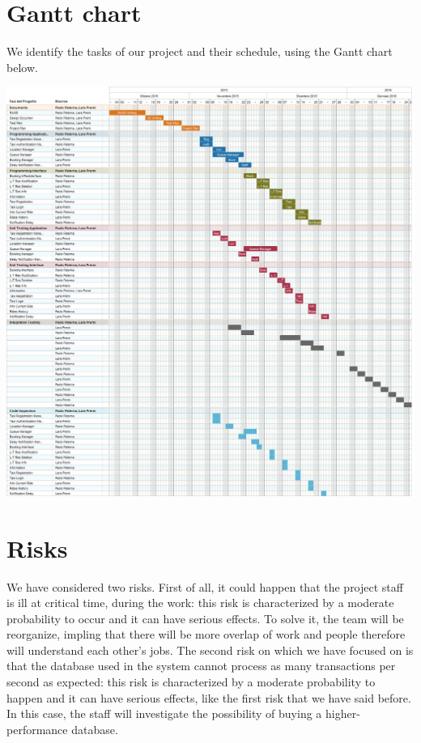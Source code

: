 \section{Gantt chart}
We identify the tasks of our project and their schedule, using the Gantt chart below.
		\begin{center}
			\includegraphics[width=1\textwidth]{./images/myTaxiService.png}
		\end{center}
\section{Risks}
We have considered two risks. First of all, it could happen that the project staff is ill at critical time, during the work: this risk is characterized by a moderate probability to occur and it can have serious effects. To solve it, the team will be reorganize, impling that there will be more overlap of work and people therefore will understand each other's jobs.
The second risk on which we have focused on is that the database used in the system cannot process as many transactions per second as expected: this risk is characterized by a moderate probability to happen and it can have serious effects, like the first risk that we have said before. In this case, the staff will investigate the possibility of buying a higher-performance database.
	